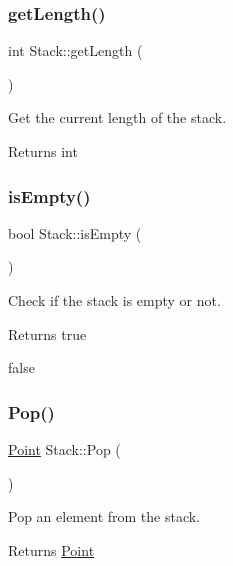 \subsubsection{\texorpdfstring{get\+Length()}{getLength()}}
{\footnotesize\ttfamily int Stack\+::get\+Length (\begin{DoxyParamCaption}{ }\end{DoxyParamCaption})}



Get the current length of the stack. 

\begin{DoxyReturn}{Returns}
int 
\end{DoxyReturn}
\mbox{\label{classStack_acfd33dabc532e2706dea1699a4de2636}} 
\subsubsection{\texorpdfstring{is\+Empty()}{isEmpty()}}
{\footnotesize\ttfamily bool Stack\+::is\+Empty (\begin{DoxyParamCaption}{ }\end{DoxyParamCaption})}



Check if the stack is empty or not. 

\begin{DoxyReturn}{Returns}
true 

false 
\end{DoxyReturn}
\mbox{\label{classStack_acf31e26723c54767d07ec477b1afa83a}} 
\subsubsection{\texorpdfstring{Pop()}{Pop()}}
{\footnotesize\ttfamily \hyperlink{classPoint}{Point} Stack\+::\+Pop (\begin{DoxyParamCaption}{ }\end{DoxyParamCaption})}



Pop an element from the stack. 

\begin{DoxyReturn}{Returns}
\hyperlink{classPoint}{Point} 
\end{DoxyReturn}
\mbox{\label{classStack_a384072a832799839cfdb898f08155e26}} 
